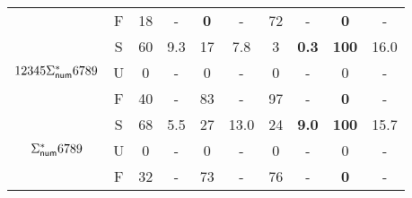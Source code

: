 {\begin{table}[ht]
{\begin{tabular}{cccccccccc}
        & F & 18 & - & {\bf 0} & - & 72 & - & {\bf 0} & - \\ 
        \cline{1-10}
       \multirow{3}{*}{\scriptsize{$12345\Sigma^*_{\sf num}6789$}} & S & 60 & 9.3 & 17 & 7.8 & 3 & {\bf 0.3} & {\bf 100} & 16.0 \\
        \cline{2-10}
        & U & 0 & - & 0 & - & 0 & - & 0 & - \\
         \cline{2-10}
        & F & 40 & - & 83 & - & 97 & - & {\bf 0} & - \\
        \cline{1-10}
       \multirow{3}{*}{\scriptsize{$\Sigma^*_{\sf num}6789$}} & S & 68 & 5.5 & 27 & 13.0 & 24 & {\bf 9.0} & {\bf 100} & 15.7 \\
        \cline{2-10}
        & U & 0 & - & 0 & - & 0 & - & 0 & - \\
         \cline{2-10}
        & F & 32 & - & 73 & - & 76 & - & {\bf 0} &- \\
        \hline
       \end{tabular}
    }
           \label{table:string}
\end{table}
}